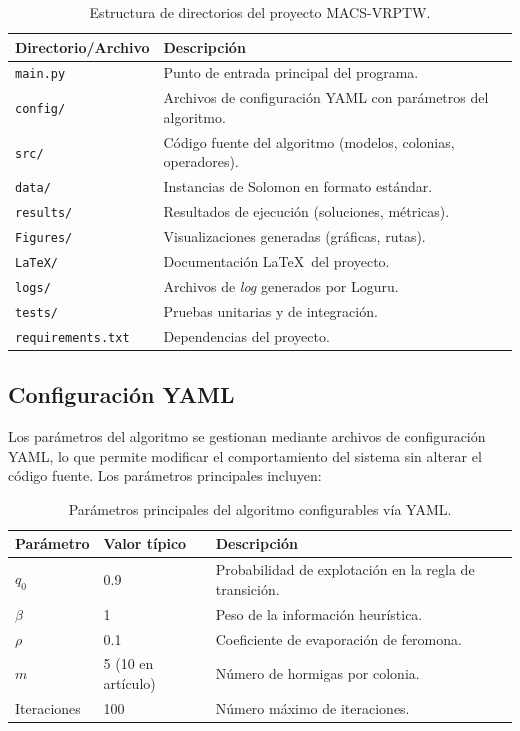 \documentclass[12pt, letterpaper]{article}
\begin{document}
\begin{table}[H]
  \centering
  \caption{Estructura de directorios del proyecto MACS-VRPTW.}
  \label{tab:estructura}
  \begin{tabularx}{\textwidth}{lX}
    \toprule
    \textbf{Directorio/Archivo} & \textbf{Descripción} \\
    \midrule
    \texttt{main.py}          & Punto de entrada principal del programa. \\
    \texttt{config/}          & Archivos de configuración YAML con parámetros del algoritmo. \\
    \texttt{src/}             & Código fuente del algoritmo (modelos, colonias, operadores). \\
    \texttt{data/}            & Instancias de Solomon en formato estándar. \\
    \texttt{results/}         & Resultados de ejecución (soluciones, métricas). \\
    \texttt{Figures/}         & Visualizaciones generadas (gráficas, rutas). \\
    \texttt{LaTeX/}           & Documentación \LaTeX\ del proyecto. \\
    \texttt{logs/}            & Archivos de \textit{log} generados por Loguru. \\
    \texttt{tests/}           & Pruebas unitarias y de integración. \\
    \texttt{requirements.txt} & Dependencias del proyecto. \\
    \bottomrule
  \end{tabularx}
\end{table}

\subsection{Configuración YAML}
\label{subsec:yaml}

Los parámetros del algoritmo se gestionan mediante archivos de configuración YAML, lo que permite modificar el comportamiento del sistema sin alterar el código fuente. Los parámetros principales incluyen:

\begin{table}[H]
  \centering
  \caption{Parámetros principales del algoritmo configurables vía YAML.}
  \label{tab:parametros}
  \begin{tabular}{llp{6cm}}
    \toprule
    \textbf{Parámetro} & \textbf{Valor típico} & \textbf{Descripción} \\
    \midrule
    $q_0$    & 0.9   & Probabilidad de explotación en la regla de transición. \\
    $\beta$  & 1     & Peso de la información heurística. \\
    $\rho$   & 0.1   & Coeficiente de evaporación de feromona. \\
    $m$      & 5 (10 en artículo) & Número de hormigas por colonia. \\
    Iteraciones & 100 & Número máximo de iteraciones. \\
    \bottomrule
  \end{tabular}
\end{table}
\end{document}

